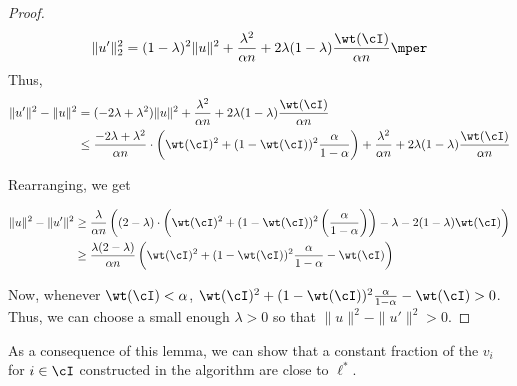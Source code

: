 \begin{proof}
\[ \|u'\|_2^2 = (1-\lambda)^2 \|u\|^2 +  \frac{\lambda^2}{\alpha n} + 2 \lambda(1-\lambda)\frac{\wt(\cI)}{\alpha n} \mper\] 
Thus, 
\begin{align*}
    \|u'\|^2 - \|u\|^2  &= (-2\lambda+\lambda^2) \|u\|^2 +  \frac{\lambda^2}{\alpha n} + 2 \lambda(1-\lambda)\frac{\wt(\cI)}{\alpha n}\\
    &\leq \frac{-2\lambda+\lambda^2}{\alpha n}\cdot \left( \wt(\cI)^2 + (1-\wt(\cI))^2 \frac{\alpha}{1-\alpha} \right) +  \frac{\lambda^2}{\alpha n} + 2 \lambda(1-\lambda)\frac{\wt(\cI)}{\alpha n}
\end{align*}

Rearranging, we get

\begin{align*} \|u\|^2 - \|u'\|^2 &\geq \frac{\lambda}{\alpha n} \left( (2-\lambda) \cdot \left( \wt(\cI)^2 + (1-\wt(\cI))^2 \left(\frac{\alpha}{1-\alpha}\right) \right) -  \lambda - 2 (1-\lambda)\wt(\cI)\right)\\
&\geq \frac{\lambda ( 2-\lambda)}{\alpha n} \left( \wt(\cI)^2 + (1-\wt(\cI))^2 \frac{\alpha}{1-\alpha} - \wt(\cI)\right)\\
\end{align*}

Now, whenever $\wt(\cI) < \alpha$, $\wt(\cI)^2 + (1-\wt(\cI))^2 \frac{\alpha}{1-\alpha} - \wt(\cI)> 0$. Thus, we can choose a small enough $\lambda > 0$ so that $\|u\|^2 - \|u'\|^2 > 0$. %


\end{proof}



As a consequence of this lemma, we can show that a constant fraction of the $v_i$ for $i \in \cI$ constructed in the algorithm are close to $\ell^*$. 

